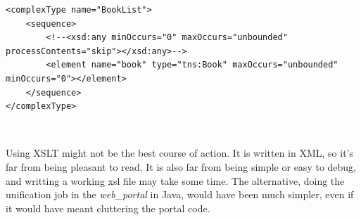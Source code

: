 \begin{lstlisting}
<complexType name="BookList">
	<sequence>
		<!--<xsd:any minOccurs="0" maxOccurs="unbounded" processContents="skip"></xsd:any>-->
		<element name="book" type="tns:Book" maxOccurs="unbounded" minOccurs="0"></element>
	</sequence>
</complexType>
\end{lstlisting}
\

\begin{framewarning}
    Using XSLT might not be the best course of action. It is written in XML, so
    it's far from being pleasant to read. It is also far from being simple or
    easy to debug, and writting a working xsl file may take some time. The
    alternative, doing the unification job in the \emph{web\_portal} in Java,
    would have been much simpler, even if it would have meant cluttering the
    portal code.
\end{framewarning}

\newpage
